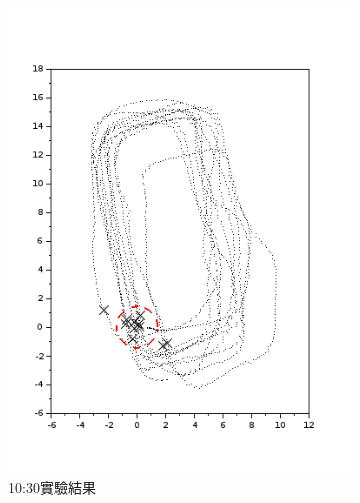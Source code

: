 \begin{figure}[h!]
	\centering
	\begin{subfigure}[t]{0.32\textwidth}
		\includegraphics[width=\textwidth]{figures/appendix1/dynamic_1}
		\caption{10:30實驗結果}
		\label{f:app:dynamic_1}
	\end{subfigure}
	\begin{subfigure}[t]{0.32\textwidth}

\end{subfigure}
\end{figure}
